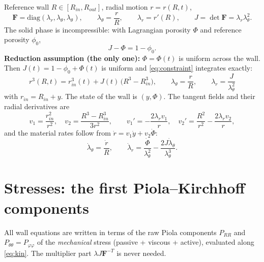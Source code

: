 \documentclass[11pt,a4paper]{article}
\newcommand{\bF}{\mathbf F}
\newcommand{\Rin}{R_{in}}
\newcommand{\Rout}{R_{out}}
\newcommand{\rin}{r_{in}}
\newcommand{\lt}{\lambda_\theta}
\newcommand{\lr}{\lambda_r}
\begin{document}
Reference wall $R\in[\Rin,\Rout]$, radial motion $r=r(R,t)$,
\begin{equation}
\bF=\mathrm{diag}(\lr,\lt,\lt),\qquad \lt=\frac rR,\qquad \lr=r'(R),\qquad J=\det\bF=\lr\lt^2 .
\end{equation}
The solid phase is incompressible: with Lagrangian porosity $\Phi$ and reference porosity $\phi_0$,
\begin{equation}
J-\Phi=1-\phi_0 .
\label{eq:constraint}
\end{equation}
\textbf{Reduction assumption (the only one):} $\Phi=\Phi(t)$ is uniform across the wall. Then $J(t)=1-\phi_0+\Phi(t)$ is uniform and \eqref{eq:constraint} integrates exactly:
\begin{equation}
\boxed{\;r^3(R,t)=\rin^3(t)+J(t)\,\big(R^3-\Rin^3\big),\qquad \lt=\frac rR,\qquad \lr=\frac{J}{\lt^2}\;}
\label{eq:kin}
\end{equation}
with $\rin=\Rin+y$. The state of the wall is $(y,\Phi)$. The tangent fields and their radial derivatives are
\begin{equation}
v_1=\frac{\rin^2}{r^2},\quad v_2=\frac{R^3-\Rin^3}{3r^2},\qquad
v_1'=-\frac{2\lr v_1}{r},\quad v_2'=\frac{R^2}{r^2}-\frac{2\lr v_2}{r},
\label{eq:tangent}
\end{equation}
and the material rates follow from $\dot r=v_1\dot y+v_2\dot\Phi$:
\begin{equation}
\dot\lt=\frac{\dot r}{R},\qquad \dot\lr=\frac{\dot\Phi}{\lt^2}-\frac{2J\dot\lt}{\lt^3}.
\label{eq:rates}
\end{equation}

\section{Stresses: the first Piola--Kirchhoff components}

All wall equations are written in terms of the raw Piola components $P_{RR}$ and $P_{\theta\theta}=P_{\varphi\varphi}$ of the \emph{mechanical} stress (passive + viscous + active), evaluated along \eqref{eq:kin}. The multiplier part $\lambda J\bF^{-T}$ is never needed.
\end{document}
